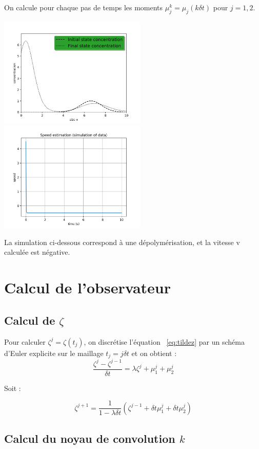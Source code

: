 \documentclass[a4paper]{article}
\begin{document}
On calcule pour chaque pas de temps les moments $\mu_j^k = \mu_j(k \delta t)$ pour $j=1,2$. 

\includegraphics[width=7cm]{figures/state_if.png}
\includegraphics[width=7cm]{figures/Vitesse.png}

La simulation ci-dessous correspond à une dépolymérisation, et la vitesse v calculée est négative.

\section{Calcul de l'observateur}

\subsection{Calcul de $\zeta$}

Pour calculer $\zeta^j = \zeta(t_j) $, 
on discrétise l'équation ~\eqref{eq:tildez} 
par un schéma d'Euler explicite
sur le maillage $t_j = j\delta t$
et on obtient :
\[
\frac{\zeta^{j}-\zeta^{j-1}}{\delta t} = \lambda \zeta^{j} + \mu_1^j + \mu_2^j
\]

Soit :

\[
\zeta^{j+1} = \frac{1}{1-\lambda \delta t}(\zeta^{j-1} + \delta t \mu_1^j + \delta t \mu_2^j)
\]

\subsection{Calcul du noyau de convolution $k$}
\end{document}

